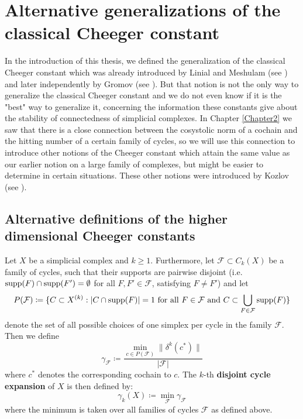 
\chapter{Alternative generalizations of the classical Cheeger constant}

\label{Chapter6}

In the introduction of this thesis, we defined the generalization of the classical Cheeger constant which was already introduced by Linial and Meshulam (see \cite{2}) and later independently by Gromov (see \cite{3}). But that notion is not the only way to generalize the classical Cheeger constant and we do not even know if it is the "best" way to generalize it, concerning the information these constants give about the stability of connectedness of simplicial complexes. In Chapter \ref{Chapter2} we saw that there is a close connection between the cosystolic norm of a cochain and the hitting number of a certain family of cycles, so we will use this connection to introduce other notions of the Cheeger constant which attain the same value as our earlier notion on a large family of complexes, but might be easier to determine in certain situations. These other notions were introduced by Kozlov (see \cite{13}).

\section{Alternative definitions of the higher dimensional Cheeger constants}

\begin{defi}
Let \(X\) be a simplicial complex and \(k\geq 1\). Furthermore, let \(\mathcal{F}\subset C_k(X)\) be a family of cycles, such that their supports are pairwise disjoint (i.e. \(\mathrm{supp}(F)\cap\mathrm{supp}(F')=\emptyset\) for all \(F,F'\in\mathcal{F}\), satisfying \(F\neq F'\)) and let
\[
P(\mathcal{F})\coloneqq\{C\subset X^{(k)}:|C\cap\mathrm{supp}(F)|=1\text{ for all }F\in\mathcal{F}\text{ and }C\subset\bigcup\limits_{F\in\mathcal{F}}\mathrm{supp}(F)\}
\]
denote the set of all possible choices of one simplex per cycle in the family \(\mathcal{F}\). Then we define
\[
\gamma_{\mathcal{F}}\coloneqq\frac{\min\limits_{c\in P(\mathcal{F})}\|\delta^k(c^*)\|}{|\mathcal{F}|}
\]
where \(c^*\) denotes the corresponding cochain to \(c\). The \(k\)-th \textbf{disjoint cycle expansion} of \(X\) is then defined by:
\[
\gamma_k(X)\coloneqq\min\limits_{\mathcal{F}}\gamma_{\mathcal{F}}
\]
where the minimum is taken over all families of cycles \(\mathcal{F}\) as defined above.
\end{defi}

